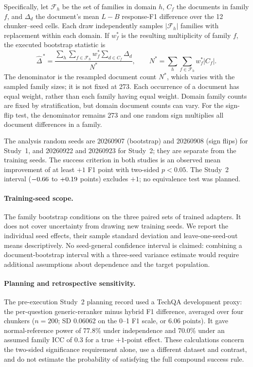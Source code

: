 Specifically, let $\mathcal{F}_h$ be the set of families in domain $h$, $C_f$ the documents in family $f$, and $\Delta_d$ the document's mean $L-B$ response-F1 difference over the 12 chunker--seed cells. Each draw independently samples $|\mathcal{F}_h|$ families with replacement within each domain. If $w_f^*$ is the resulting multiplicity of family $f$, the executed bootstrap statistic is
\begin{equation}
\widehat{\Delta}^{\,*}=\frac{\sum_h\sum_{f\in\mathcal{F}_h}w_f^*\sum_{d\in C_f}\Delta_d}{N^*},\qquad
N^*=\sum_h\sum_{f\in\mathcal{F}_h}w_f^*|C_f|.
\end{equation}
The denominator is the resampled document count $N^*$, which varies with the sampled family sizes; it is not fixed at 273. Each occurrence of a document has equal weight, rather than each family having equal weight. Domain family counts are fixed by stratification, but domain document counts can vary. For the sign-flip test, the denominator remains 273 and one random sign multiplies all document differences in a family.

The analysis random seeds are 20260907 (bootstrap) and 20260908 (sign flips) for Study~1, and 20260922 and 20260923 for Study~2; they are separate from the training seeds. The success criterion in both studies is an observed mean improvement of at least $+1$ F1 point with two-sided $p<0.05$. The Study~2 interval ($-0.66$ to $+0.19$ points) excludes $+1$; no equivalence test was planned.

\paragraph{Training-seed scope.} The family bootstrap conditions on the three paired sets of trained adapters. It does not cover uncertainty from drawing new training seeds. We report the individual seed effects, their sample standard deviation and leave-one-seed-out means descriptively. No seed-general confidence interval is claimed: combining a document-bootstrap interval with a three-seed variance estimate would require additional assumptions about dependence and the target population.

\paragraph{Planning and retrospective sensitivity.} The pre-execution Study~2 planning record used a TechQA development proxy: the per-question generic-reranker minus hybrid F1 difference, averaged over four chunkers ($n=200$; SD 0.06062 on the 0--1 F1 scale, or 6.06 points). It gave normal-reference power of 77.8\% under independence and 70.0\% under an assumed family ICC of 0.3 for a true $+1$-point effect. These calculations concern the two-sided significance requirement alone, use a different dataset and contrast, and do not estimate the probability of satisfying the full compound success rule.

